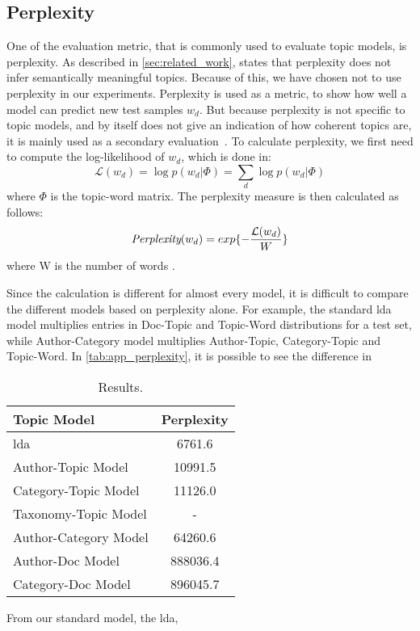 \subsection{Perplexity}\label{app:perplexity}
One of the evaluation metric, that is commonly used to evaluate topic models, is perplexity.
As described in \autoref{sec:related_work}, \citet{tea_leaves} states that perplexity does not infer semantically meaningful topics.
Because of this, we have chosen not to use perplexity in our experiments.
Perplexity is used as a metric, to show how well a model can predict new test samples $w_d$.
But because perplexity is not specific to topic models, and by itself does not give an indication of how coherent topics are, it is mainly used as a secondary evaluation~\cite{tea_leaves}.
To calculate perplexity, we first need to compute the log-likelihood of $w_d$, which is done in:
\begin{equation}\label{eq:likelihood}
	\mathcal{L}(w_d) = \log p(w_d|\Phi) = \sum_{d} \log p(w_d|\Phi)
\end{equation}
\noindent where $\Phi$ is the topic-word matrix.
The perplexity measure is then calculated as follows:
\begin{equation}
	\emph{Perplexity}(w_d) = exp \{-\frac{\mathcal{L}(w_d)}{W}\}
\end{equation}
\noindent where W is the number of words \cite{de2008evaluating}.

Since the calculation is different for almost every model, it is difficult to compare the different models based on perplexity alone.
For example, the standard \gls{lda} model multiplies entries in Doc-Topic and Topic-Word distributions for a test set, while Author-Category model multiplies Author-Topic, Category-Topic and Topic-Word.
In \autoref{tab:app_perplexity}, it is possible to see the difference in 

\begin{table}[h]
	\centering
	\caption{Results.}
	\begin{tabular}{l|c}
		Topic Model & Perplexity \\
		\midrule
		\Acrlong{lda} & 6761.6 \\
		Author-Topic Model & 10991.5 \\
		Category-Topic Model & 11126.0 \\
		Taxonomy-Topic Model & - \\
		Author-Category Model & 64260.6  \\
		Author-Doc Model & 888036.4  \\
		Category-Doc Model & 896045.7 \\
	\end{tabular}
	\label{tab:app_perplexity}
\end{table}

From our standard model, the \gls{lda}, 